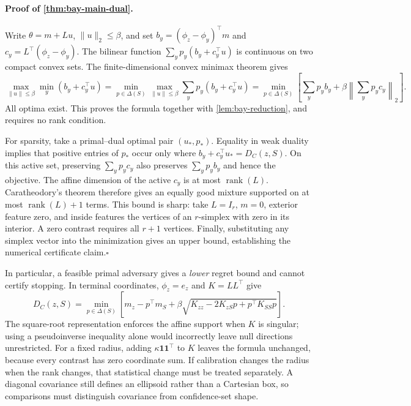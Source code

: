 \documentclass{article}
\theoremstyle{plain}
\theoremstyle{definition}
\begin{document}
\paragraph{Proof of \cref{thm:bay-main-dual}.}
Write $\theta=m+Lu$, $\|u\|_2\le\beta$, and set
$b_y=(\phi_z-\phi_y)^\top m$ and
$c_y=L^\top(\phi_z-\phi_y)$.  The bilinear function
$\sum_y p_y(b_y+c_y^\top u)$ is continuous on two compact convex sets.
The finite-dimensional convex minimax theorem \citep{sion1958} gives
\[
 \max_{\|u\|\le\beta}\min_y(b_y+c_y^\top u)
 =\min_{p\in\Delta(S)}\max_{\|u\|\le\beta}
       \sum_y p_y(b_y+c_y^\top u)
 =\min_{p\in\Delta(S)}
       \left[\sum_y p_yb_y+\beta\left\|\sum_y p_yc_y\right\|_2\right].
\]
All optima exist.  This proves the formula together with
\cref{lem:bay-reduction}, and requires no rank condition.

For sparsity, take a primal--dual optimal pair $(u_*,p_*)$.
Equality in weak duality implies that positive entries of $p_*$ occur
only where $b_y+c_y^\top u_*=D_C(z,S)$.  On this active set, preserving
$\sum_y p_yc_y$ also preserves $\sum_y p_yb_y$ and hence the objective.
The affine dimension of the active $c_y$ is at most $\operatorname{rank}(L)$.
Caratheodory's theorem therefore gives an equally good mixture supported
on at most $\operatorname{rank}(L)+1$ terms.  This bound is sharp: take
$L=I_r$, $m=0$, exterior feature zero, and inside features the vertices
of an $r$-simplex with zero in its interior.  A zero contrast requires
all $r+1$ vertices.  Finally, substituting any simplex vector into the
minimization gives an upper bound, establishing the numerical
certificate claim.\hfill$\square$

In particular, a feasible primal adversary gives a \emph{lower} regret
bound and cannot certify stopping.  In terminal coordinates,
$\phi_z=e_z$ and $K=LL^\top$ give
\[
 D_C(z,S)=\min_{p\in\Delta(S)}
 \left[m_z-p^\top m_S+
 \beta\sqrt{K_{zz}-2K_{zS}p+p^\top K_{SS}p}\right].
\]
The square-root representation enforces the affine support when $K$ is
singular; using a pseudoinverse inequality alone would incorrectly
leave null directions unrestricted.  For a fixed radius, adding
$\kappa\mathbf 1\mathbf 1^\top$ to $K$ leaves the formula unchanged,
because every contrast has zero coordinate sum.  If calibration changes
the radius when the rank changes, that statistical change must be treated
separately.  A diagonal covariance still defines an ellipsoid rather
than a Cartesian box, so comparisons must distinguish covariance from
confidence-set shape.
\end{document}
